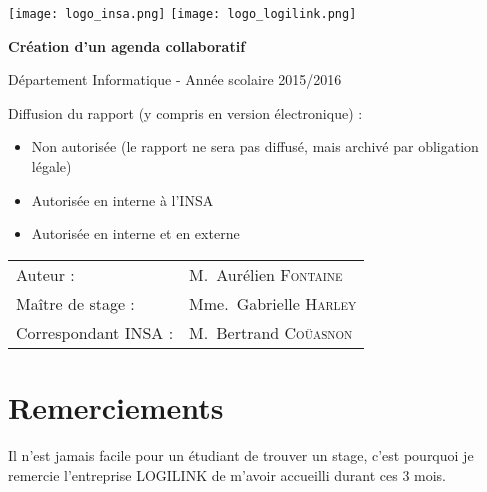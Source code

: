 \documentclass[a4paper, 11pt]{report}
\begin{document}
\renewcommand{\bibname}{Réferences}

    \begin{titlepage}
        \texttt{[image: logo\_insa.png]}
        \hspace{0.35\textwidth}
        \texttt{[image: logo\_logilink.png]}
        \begin{center}
            \vspace{7cm}
            {\huge\bfseries Création d'un agenda collaboratif \par}
            \vspace{0.5cm}
            {\Large Département Informatique - Année scolaire 2015/2016\par}
        \end{center}
        \vfill

        Diffusion du rapport (y compris en version électronique) :

        \begin{itemize}[label=$\square$]
            \item Non autorisée (le rapport ne sera pas diffusé, mais archivé par obligation légale)
            \item Autorisée en interne à l’INSA
            \item Autorisée en interne et en externe
        \end{itemize}

        \vspace{0.5cm}

        \begin{tabular}{ll}
            {\Large Auteur :}             & M.~Aurélien \textsc{Fontaine}\\
            {\Large Maître de stage :}    & Mme.~Gabrielle \textsc{Harley}\\
            {\Large Correspondant INSA :} & M.~Bertrand \textsc{Coüasnon}\\
        \end{tabular}
    \end{titlepage}

\chapter*{Remerciements}

Il n'est jamais facile pour un étudiant de trouver un stage, c'est pourquoi je remercie l'entreprise LOGILINK de m'avoir accueilli durant ces 3 mois.
\end{document}
